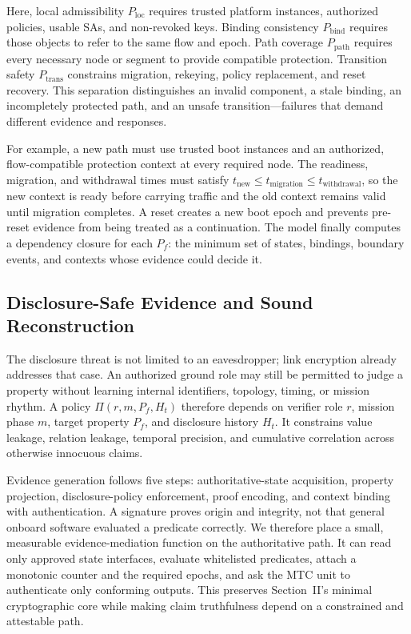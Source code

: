 \documentclass[journal]{IEEEtran}
\begin{document}
Here, local admissibility \(P_{\mathrm{loc}}\) requires trusted platform
instances, authorized policies, usable SAs, and non-revoked keys. Binding
consistency \(P_{\mathrm{bind}}\) requires those objects to refer to the same
flow and epoch. Path coverage \(P_{\mathrm{path}}\) requires every necessary
node or segment to provide compatible protection. Transition safety
\(P_{\mathrm{trans}}\) constrains migration, rekeying, policy replacement, and
reset recovery. This separation distinguishes an invalid component, a stale
binding, an incompletely protected path, and an unsafe transition---failures
that demand different evidence and responses.

For example, a new path must use trusted boot instances and an authorized,
flow-compatible protection context at every required node. The readiness,
migration, and withdrawal times must satisfy
\(t_{\mathrm{new}}\leq t_{\mathrm{migration}}\leq
t_{\mathrm{withdrawal}}\), so the new context is ready before carrying traffic
and the old context remains valid until migration completes. A reset creates a
new boot epoch and prevents
pre-reset evidence from being treated as a continuation. The model finally
computes a dependency closure for each \(P_f\): the minimum set of states,
bindings, boundary events, and contexts whose evidence could decide it.

\subsection{Disclosure-Safe Evidence and Sound Reconstruction}
The disclosure threat is not limited to an eavesdropper; link encryption already
addresses that case. An authorized ground role may still be permitted to judge
a property without learning internal identifiers, topology, timing, or mission
rhythm. A policy \(\Pi(r,m,P_f,H_t)\) therefore depends on verifier role \(r\),
mission phase \(m\), target property \(P_f\), and disclosure history \(H_t\).
It constrains value leakage, relation leakage, temporal precision, and cumulative
correlation across otherwise innocuous claims.

Evidence generation follows five steps: authoritative-state acquisition,
property projection, disclosure-policy enforcement, proof encoding, and context
binding with authentication. A signature proves origin and integrity, not that
general onboard software evaluated a predicate correctly. We therefore place a
small, measurable evidence-mediation function on the authoritative path. It can
read only approved state interfaces, evaluate whitelisted predicates, attach a
monotonic counter and the required epochs, and ask the MTC unit to authenticate
only conforming outputs. This preserves Section~II's minimal cryptographic core
while making claim truthfulness depend on a constrained and attestable path.
\end{document}
